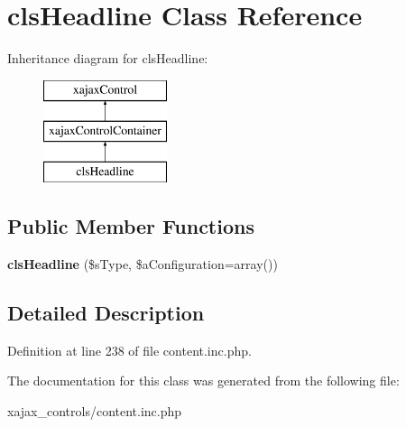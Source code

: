 \hypertarget{classclsHeadline}{
\section{clsHeadline Class Reference}
\label{classclsHeadline}
}
Inheritance diagram for clsHeadline:\begin{figure}[H]
\begin{center}
\leavevmode
\includegraphics[height=3.000000cm]{classclsHeadline}
\end{center}
\end{figure}
\subsection*{Public Member Functions}
\begin{DoxyCompactItemize}
\item 
\hypertarget{classclsHeadline_af429d959224b68536104797350496c84}{
{\bfseries clsHeadline} (\$sType, \$aConfiguration=array())}
\label{classclsHeadline_af429d959224b68536104797350496c84}

\end{DoxyCompactItemize}


\subsection{Detailed Description}


Definition at line 238 of file content.inc.php.



The documentation for this class was generated from the following file:\begin{DoxyCompactItemize}
\item 
xajax\_\-controls/content.inc.php\end{DoxyCompactItemize}
